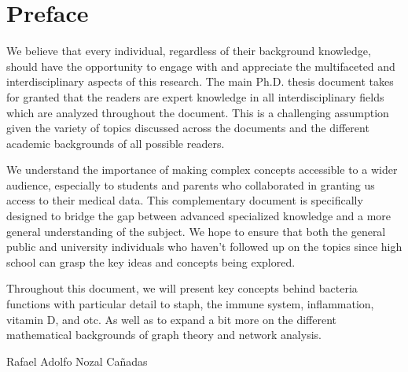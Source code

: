 \documentclass[12pt,twoside,a4paper,fleqn, english]{report}
\begin{document}
\chapter*{Preface}

        We believe that every individual, regardless of their background knowledge, should have the opportunity to engage with and appreciate the multifaceted and interdisciplinary aspects of this research. The main Ph.D. thesis document takes for granted that the readers are expert knowledge in all interdisciplinary fields which are analyzed throughout the document. This is a challenging assumption given the variety of topics discussed across the documents and the different academic backgrounds of all possible readers. 

        We understand the importance of making complex concepts accessible to a wider audience, especially to students and parents who collaborated in granting us access to their medical data. This complementary document is specifically designed to bridge the gap between advanced specialized knowledge and a more general understanding of the subject. We hope to ensure that both the general public and university individuals who haven't followed up on the topics since high school can grasp the key ideas and concepts being explored.
        
        Throughout this document, we will present key concepts behind bacteria functions with particular detail to \gls{staph}, the immune system, inflammation, vitamin D, and \gls{otc}. As well as to expand a bit more on the different mathematical backgrounds of graph theory and network analysis.

        Rafael Adolfo Nozal Cañadas

    \cleardoublepage

%

\printglossary[type=\acronymtype,title=Abbreviations]

%
\setcounter{tocdepth}{4}            %
\tableofcontents                    %
\cleardoublepage                    %
\end{document}
